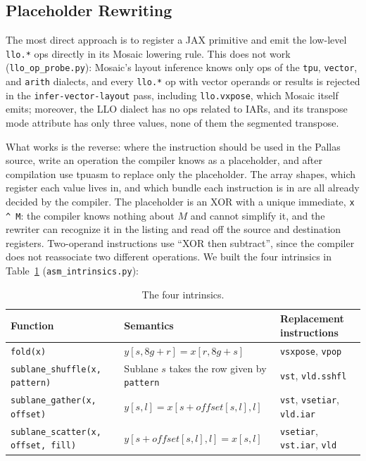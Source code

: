 \documentclass[sigconf,nonacm,balance=false]{acmart}
\newcommand{\code}[1]{\texttt{#1}}
\begin{document}
\subsection{Placeholder Rewriting}
\label{sec:7.1}

The most direct approach is to register a JAX primitive and emit the low-level \code{llo.\allowbreak{}*} ops directly in its Mosaic lowering rule. This does not work (\code{llo\_\allowbreak{}op\_\allowbreak{}probe.\allowbreak{}py}): Mosaic's layout inference knows only ops of the \code{tpu}, \code{vector}, and \code{arith} dialects, and every \code{llo.\allowbreak{}*} op with vector operands or results is rejected in the \code{infer-vector-layout} pass, including \code{llo.\allowbreak{}vxpose}, which Mosaic itself emits; moreover, the LLO dialect has no ops related to IARs, and its transpose mode attribute has only three values, none of them the segmented transpose.

What works is the reverse: where the instruction should be used in the Pallas source, write an operation the compiler knows as a placeholder, and after compilation use tpuasm to replace only the placeholder. The array shapes, which register each value lives in, and which bundle each instruction is in are all already decided by the compiler. The placeholder is an XOR with a unique immediate, \code{x \textasciicircum{} M}: the compiler knows nothing about $M$ and cannot simplify it, and the rewriter can recognize it in the listing and read off the source and destination registers. Two-operand instructions use ``XOR then subtract'', since the compiler does not reassociate two different operations. We built the four intrinsics in Table~\ref{tab:14} (\code{asm\_\allowbreak{}intrinsics.\allowbreak{}py}):

\begin{table}
\centering
\caption{The four intrinsics.}
\label{tab:14}
\begin{tabular}{lll}
\toprule
Function & Semantics & Replacement instructions \\
\midrule
\code{fold(\allowbreak{}x)} & $y[s, 8g+r] = x[r, 8g+s]$ & \code{vsxpose}, \code{vpop} \\
\code{sublane\_\allowbreak{}shuffle(\allowbreak{}x,\allowbreak{} pattern)} & Sublane $s$ takes the row given by \code{pattern} & \code{vst}, \code{vld.\allowbreak{}sshfl} \\
\code{sublane\_\allowbreak{}gather(\allowbreak{}x,\allowbreak{} offset)} & $y[s, l] = x[s + \mathit{offset}[s, l], l]$ & \code{vst}, \code{vsetiar}, \code{vld.\allowbreak{}iar} \\
\code{sublane\_\allowbreak{}scatter(\allowbreak{}x,\allowbreak{} offset,\allowbreak{} fill)} & $y[s + \mathit{offset}[s, l], l] = x[s, l]$ & \code{vsetiar}, \code{vst.\allowbreak{}iar}, \code{vld} \\
\bottomrule
\end{tabular}
\end{table}
\end{document}
